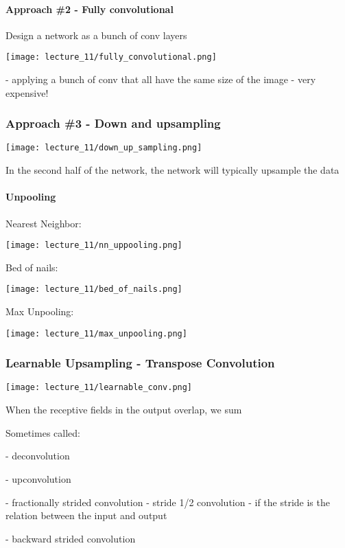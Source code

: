 \paragraph{Approach \#2 - Fully convolutional}

Design a network as a bunch of conv layers

\texttt{[image: lecture\_11/fully\_convolutional.png]}

- applying a bunch of conv that all have the same size of the image - very expensive!

\subsubsection{Approach \#3 - Down and upsampling}

\texttt{[image: lecture\_11/down\_up\_sampling.png]}

In the second half of the network, the network will typically upsample the data

\paragraph{Unpooling}

Nearest Neighbor:

\texttt{[image: lecture\_11/nn\_uppooling.png]}

Bed of nails:

\texttt{[image: lecture\_11/bed\_of\_nails.png]}

Max Unpooling:

\texttt{[image: lecture\_11/max\_unpooling.png]}

\subsubsection{Learnable Upsampling - Transpose Convolution }

\texttt{[image: lecture\_11/learnable\_conv.png]}

When the receptive fields in the output overlap, we sum

Sometimes called: 

- deconvolution

- upconvolution

- fractionally strided convolution 
- stride 1/2 convolution - if the stride is the relation between the input and output

- backward strided convolution

